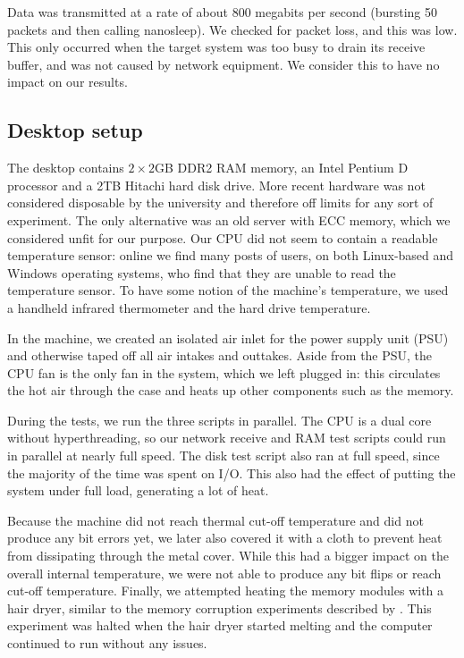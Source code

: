 \documentclass[conference]{IEEEtran}
\begin{document}
Data was transmitted at a rate of about 800 megabits per second (bursting 50
packets and then calling nanosleep). We checked for packet loss, and this was
low. This only occurred when the target system was too busy to drain its
receive buffer, and was not caused by network equipment. We consider this to
have no impact on our results.


\subsection{Desktop setup}

The desktop contains $2\times2$GB DDR2 RAM memory, an Intel Pentium D processor
and a 2TB Hitachi hard disk drive. More recent hardware was not considered
disposable by the university and therefore off limits for any sort of
experiment. The only alternative was an old server with ECC memory, which we
considered unfit for our purpose. Our CPU did not seem to contain a readable
temperature sensor: online we find many posts of users, on both Linux-based and
Windows operating systems, who find that they are unable to read the
temperature sensor. To have some notion of the machine's temperature, we used a
handheld infrared thermometer and the hard drive temperature.

In the machine, we created an isolated air inlet for the power supply unit
(PSU) and otherwise taped off all air intakes and outtakes. Aside from the PSU,
the CPU fan is the only fan in the system, which we left plugged in: this
circulates the hot air through the case and heats up other components such as
the memory.

During the tests, we run the three scripts in parallel. The CPU is a dual core
without hyperthreading, so our network receive and RAM test scripts could run
in parallel at nearly full speed. The disk test script also ran at full speed,
since the majority of the time was spent on I/O. This also had the effect of
putting the system under full load, generating a lot of heat.

Because the machine did not reach thermal cut-off temperature and did not
produce any bit errors yet, we later also covered it with a cloth to prevent
heat from dissipating through the metal cover. While this had a bigger impact
on the overall internal temperature, we were not able to produce any bit flips
or reach cut-off temperature. Finally, we attempted heating the memory modules
with a hair dryer, similar to the memory corruption experiments described by
\cite{jvm}. This experiment was halted when the hair dryer started melting and the
computer continued to run without any issues.
\end{document}
